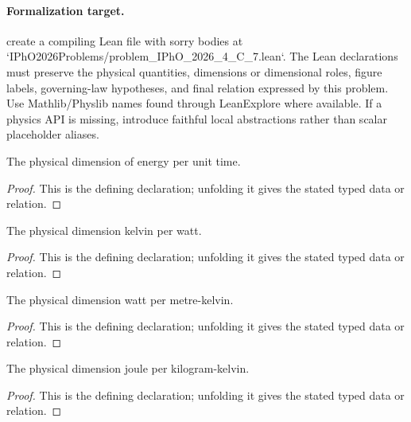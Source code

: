 \paragraph{Formalization target.}
create a compiling Lean file with sorry bodies at `IPhO2026Problems/problem\_IPhO\_2026\_4\_C\_7.lean`. The Lean declarations must preserve the physical quantities, dimensions or dimensional roles, figure labels, governing-law hypotheses, and final relation expressed by this problem.
Use Mathlib/Physlib names found through LeanExplore where available. If a physics API is missing, introduce faithful local abstractions rather than scalar placeholder aliases.

\begin{definition}[powerDimension]
  \label{decl:physics:IPhO_2026_4_C_7:powerDimension}
  The physical dimension of energy per unit time.
\end{definition}
\begin{proof}
  This is the defining declaration; unfolding it gives the stated typed data or relation.
\end{proof}

\begin{definition}[thermalResistanceDimension]
  \label{decl:physics:IPhO_2026_4_C_7:thermalResistanceDimension}
  The physical dimension kelvin per watt.
\end{definition}
\begin{proof}
  This is the defining declaration; unfolding it gives the stated typed data or relation.
\end{proof}

\begin{definition}[thermalConductivityDimension]
  \label{decl:physics:IPhO_2026_4_C_7:thermalConductivityDimension}
  The physical dimension watt per metre-kelvin.
\end{definition}
\begin{proof}
  This is the defining declaration; unfolding it gives the stated typed data or relation.
\end{proof}

\begin{definition}[specificHeatCapacityDimension]
  \label{decl:physics:IPhO_2026_4_C_7:specificHeatCapacityDimension}
  The physical dimension joule per kilogram-kelvin.
\end{definition}
\begin{proof}
  This is the defining declaration; unfolding it gives the stated typed data or relation.
\end{proof}

